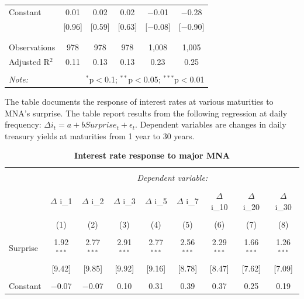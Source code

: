 \documentclass[12pt]{article}
\begin{document}
\begin{table}[!htbp]
\begin{tabular}{@{\extracolsep{5pt}}lccccc}
 Constant & 0.01 & 0.02 & 0.02 & $-$0.01 & $-$0.28 \\ 
  & [0.96] & [0.59] & [0.63] & [$-$0.08] & [$-$0.90] \\ 
  & & & & & \\ 
\hline \\[-1.8ex] 
Observations & 978 & 978 & 978 & 1,008 & 1,005 \\ 
Adjusted R$^{2}$ & 0.11 & 0.13 & 0.13 & 0.23 & 0.25 \\ 
\hline 
\hline \\[-1.8ex] 
\textit{Note:}  & \multicolumn{5}{r}{$^{*}$p$<$0.1; $^{**}$p$<$0.05; $^{***}$p$<$0.01} \\ 
\end{tabular} 
\end{table}


\begin{table}[!htbp] \centering 
  \caption{\textbf{Interest rate response to major MNA}} 
  \label{}
    \begin{flushleft}
    {\medskip\small
 The table documents the response of interest rates at various maturities to MNA's surprise. The table report results from the following regression at daily frequency: $\Delta i_t = a + b Surprise_t + \epsilon_t$. Dependent variables are changes in daily treasury yields at maturities from 1 year to 30 years.}
    \medskip
    \end{flushleft}
\begin{tabular}{@{\extracolsep{2pt}}lcccccccc} 
\\[-1.8ex]\hline 
\hline \\[-1.8ex] 
 & \multicolumn{8}{c}{\textit{Dependent variable:}} \\ 
\cline{2-9} 
\\[-1.8ex] & $\Delta$ i\_1 & $\Delta$ i\_2 & $\Delta$ i\_3 & $\Delta$ i\_5 & $\Delta$ i\_7 & $\Delta$ i\_{10} & $\Delta$ i\_{20} & $\Delta$ i\_{30} \\ 
\\[-1.8ex] & (1) & (2) & (3) & (4) & (5) & (6) & (7) & (8)\\ 
\hline \\[-1.8ex] 
 Surprise & 1.92$^{***}$ & 2.77$^{***}$ & 2.91$^{***}$ & 2.77$^{***}$ & 2.56$^{***}$ & 2.29$^{***}$ & 1.66$^{***}$ & 1.26$^{***}$ \\ 
  & [9.42] & [9.85] & [9.92] & [9.16] & [8.78] & [8.47] & [7.62] & [7.09] \\ 
  & & & & & & & & \\ 
 Constant & $-$0.07 & $-$0.07 & 0.10 & 0.31 & 0.39 & 0.37 & 0.25 & 0.19 \\ 

\end{tabular}
\end{table}
\end{document}
